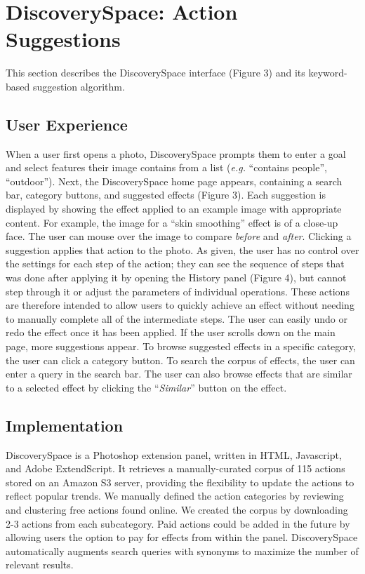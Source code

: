 \section{DiscoverySpace: Action Suggestions}
This section describes the Discovery\-Space interface (Figure 3) and its keyword-based suggestion algorithm.

\subsection{User Experience}
When a user first opens a photo, Discovery\-Space prompts them to enter a goal and select features their image contains from a list (\textit{e.g.} ``contains people'', ``outdoor''). Next, the Discovery\-Space home page appears, containing a search bar, category buttons, and suggested effects (Figure 3). Each suggestion is displayed by showing the effect applied to an example image with appropriate content. For example, the image for a ``skin smoothing'' effect is of a close-up face. The user can mouse over the image to compare \textit{before} and \textit{after}. Clicking a suggestion applies that action to the photo. As given, the user has no control over the settings for each step of the action; they can see the sequence of steps that was done after applying it by opening the History panel (Figure 4), but cannot step through it or adjust the parameters of individual operations. These actions are therefore intended to allow users to quickly achieve an effect without needing to manually complete all of the intermediate steps. The user can easily undo or redo the effect once it has been applied. If the user scrolls down on the main page, more suggestions appear. To browse suggested effects in a specific category, the user can click a category button. To search the corpus of effects, the user can enter a query in the search bar. The user can also browse effects that are similar to a selected effect by clicking the ``\textit{Similar}'' button on the effect. 

\subsection{Implementation}
Discovery\-Space is a Photoshop extension panel, written in HTML, Javascript, and Adobe ExtendScript. It retrieves a manually-curated corpus of 115 actions stored on an Amazon S3 server, providing the flexibility to update the actions to reflect popular trends. We manually defined the action categories by reviewing and clustering free actions found online. We created the corpus by downloading 2-3 actions from each subcategory. Paid actions could be added in the future by allowing users the option to pay for effects from within the panel. Discovery\-Space automatically augments search queries with synonyms to maximize the number of relevant results.

